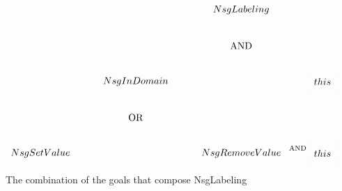 \documentclass{article}
\begin{document}
\newcommand{\vl}[1]{#1}

\begin{figure}[htb]
\[
\entrymodifiers={+<1em>[F]}
\xymatrix{
    *{}       &      *{}       & \vl{NsgLabeling}\ar[ddl]\ar[ddr] &                     *{}                     \\
    *{}       &      *{}       &           *{\txt{AND}}           &                     *{}                     \\
    *{}       & \vl{NsgInDomain}\ar[ddl]\ar[ddr]  &   *{}         & *+<1em>[F--]{\vl{this}}\ar@{.>}@/_2em/[uul] \\
    *{}       &  *{\txt{OR}}   &               *{}                &            *{}                              \\
\vl{NsgSetValue} &   *{}       &  \vl{NsgRemoveValue} \ar@{.}[r]^{\txt{\scriptsize\hspace{30pt} AND}} & *+<1em>[F--]{\vl{this}}\ar@{.>}@/_2em/[uull]
}
\]
\caption{The combination of the goals that compose \vl{NsgLabeling}}
\end{figure}
\end{document}
